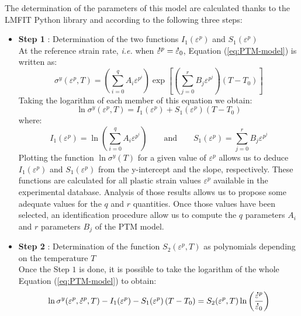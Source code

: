 \documentclass[twoside,english,1p,final,sort&compress]{elsarticle}
\makeatletter
\theoremstyle{plain}
\newcommand{\mdot}[1]{\accentset{\mbox{\bfseries .}}{#1}}
\newcommand*{\ie}{\emph{i.e.}\@\xspace}
\makeatother
\begin{document}
The determination of the parameters of this model are calculated thanks to the LMFIT Python library \cite{Newville-2016-LNL} and according to the following three steps:
\begin{itemize}
\item \textbf{Step 1} : Determination of the two functions $I_1(\varepsilon^p)$ and $S_1(\varepsilon^p)$\\
At the reference strain rate, \ie when $\mdot{\varepsilon}^p=\mdot{\varepsilon}_0$, Equation (\ref{eq:PTM-model}) is written as:
\begin{equation}
\sigma^y(\varepsilon^p,T) = \left(\sum_{i=0}^{q}{A_i\varepsilon^{p^i}}\right)
\exp\left[\left(\sum_{j=0}^{r}{B_j\varepsilon^{p^j}}\right)\left(T-T_0\right) \right]
\end{equation}
Taking the logarithm of each member of this equation we obtain:
\begin{equation}
\label{eq:I1S0}
\ln \sigma^y(\varepsilon^p,T) = I_1(\varepsilon^p) + S_1(\varepsilon^p)\left(T-T_0\right)
\end{equation}
where:
\begin{equation}
\label{eq:I1S1}
I_1(\varepsilon^p) = \ln\left(\sum_{i=0}^{q}{A_i\varepsilon^{p^i}}\right)\qquad \text{and}\qquad S_1(\varepsilon^p) = \sum_{j=0}^{r}{B_j\varepsilon^{p^j}}
\end{equation}
Plotting the function $\ln \sigma^y(T)$ for a given value of $\varepsilon^p$ allows us to deduce $I_1(\varepsilon^p)$ and $S_1(\varepsilon^p)$ from the y-intercept and the slope, respectively. These functions are calculated for all plastic strain values $\varepsilon^p$ available in the experimental database. Analysis of those results allows us to propose some adequate values for the $q$ and $r$ quantities. Once those values have been selected, an identification procedure allow us to compute the $q$ parameters $A_i$ and $r$ parameters $B_j$ of the PTM model.
\item \textbf{Step 2} : Determination of the function $S_2(\varepsilon^p,T)$ as polynomials depending on the temperature $T$\\
Once the Step $1$ is done, it is possible to take the logarithm of the whole Equation (\ref{eq:PTM-model}) to obtain:
\begin{equation}
\ln \sigma^y(\varepsilon^p,\mdot{\varepsilon}^p,T) - I_1(\varepsilon^p) - S_1(\varepsilon^p)\left(T-T_0\right) = S_2(\varepsilon^p,T)\ln\left( \frac{\mdot{\varepsilon}^p}{\mdot{\varepsilon}_0}\right)
\label{eq:SlopeS2}
\end{equation}

\end{itemize}
\end{document}
